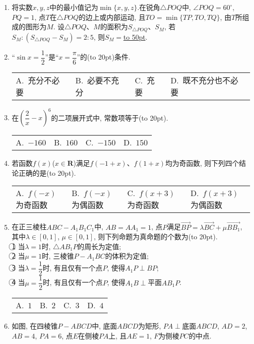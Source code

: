 \documentclass[10pt,a4paper]{article}
\newcommand{\blank}[1]{\underline{\hbox to #1pt{}}}
\newcommand{\bracket}[1]{(\hbox to #1pt{})}
\newcommand{\fourch}[4]{\par\begin{tabular}{p{.23\textwidth}p{.23\textwidth}p{.23\textwidth}p{.23\textwidth}}
A.~#1 &B.~#2& C.~#3& D.~#4
\end{tabular}}
\begin{document}
\begin{enumerate}[1.]
\begin{center}
\end{center}
\item 将实数$x,y,z$中的最小值记为$\min \{x,y,z\}$.在锐角$\triangle POQ$中, $\angle POQ=60^\circ$, $PQ=1$, 点$T$在$\triangle POQ$的边上或内部运动, 且$TO=\min \{TP,TO,TQ\}$, 由$T$所组成的图形为$M$. 设$\triangle POQ$、$M$的面积为$S_{\triangle POQ}$、$S_M$, 若$S_M:(S_{\triangle POQ}-S_M)=2:5$, 则$S_M=$\blank{50}.
\item ``$\sin x=\dfrac 12$''是``$x=\dfrac{\pi }6$''的\bracket{20}条件.
\fourch{充分不必要}{必要不充分}{充要}{既不充分也不必要}
\item 在$(\dfrac 2x-x)^6$的二项展开式中, 常数项等于\bracket{20}.
\fourch{$-160$}{$160$}{$-150$}{$150$}
\item 若函数$f(x)$($x\in \mathbf{R}$)满足$f(-1+x)$、$f(1+x)$均为奇函数, 则下列四个结论正确的是\bracket{20}.
\fourch{$f(-x)$为奇函数}{$f(-x)$为偶函数}{$f(x+3)$为奇函数}{$f(x+3)$为偶函数}
\item 在正三棱柱$ABC-A_1B_1C_1$中, $AB=AA_1=1$, 点$P$满足$\overrightarrow{BP}=\lambda \overrightarrow{BC}+\mu \overrightarrow{BB_1}$, 其中$\lambda \in [0,1]$, $\mu \in [0,1]$, 则下列命题为真命题的个数为\bracket{20}.\\
\textcircled{1} 当$\lambda =1$时, $\triangle AB_1P$的周长为定值;\\
\textcircled{2} 当$\mu =1$时, 三棱锥$P-A_1BC$的体积为定值;\\
\textcircled{3} 当$\lambda =\dfrac 12$时, 有且仅有一个点$P$, 使得$A_1P\perp BP$;\\
\textcircled{4} 当$\mu =\dfrac 12$时, 有且仅有一个点$P$, 使得$A_1B\perp$平面$AB_1P$.
\fourch{$1$}{$2$}{$3$}{$4$}
\item 如图, 在四棱锥$P-ABCD$中, 底面$ABCD$为矩形, $PA\perp$底面$ABCD$, $AD=2$, $AB=4$, $PA=6$, 点$E$在侧棱$PA$上, 且$AE=1$, $F$为侧棱$PC$的中点.
\begin{center}
\end{center}
\end{enumerate}
\end{document}
